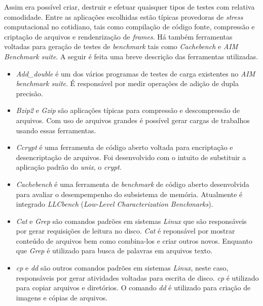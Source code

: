 Assim era possível criar, destruir e efetuar quaisquer tipos de testes com relativa comodidade. Entre as aplicações escolhidas estão típicas provedoras de \textit{stress} computacional no cotidiano, tais como compilação de código fonte, compressão e criptação de arquivos e rendenrização de \textit{frames}. Há também ferramentas voltadas para geração de testes de \textit{benchmark} tais como \textit{Cachebench} e \textit{AIM Benchmark suite}. A seguir é feita uma breve descrição das ferramentas utilizadas.

\begin{itemize}
\item \textit{Add\_double} \footnotemark[1]                                                                                                                               é um dos vários programas de testes de carga existentes no \textit{AIM benchmark suite}. É responsável por medir operações de adição de dupla precisão.

\item \textit{Bzip2} \footnotemark[2] e \textit{Gzip} \footnotemark[3] são aplicações típicas para compressão e descompressão de arquivos. Com uso de arquivos grandes é possível gerar cargas de trabalhos usando essas ferramentas.

\item \textit{Ccrypt} \footnotemark[4] é uma ferramenta de código aberto voltada para encriptação e desencriptação de arquivos. Foi desenvolvido com o intuito de substituir a aplicação padrão do \textit{unix}, o \textit{crypt}.

\item \textit{Cachebench} \footnotemark[5] é uma ferramenta de \textit{benchmark} de código aberto desenvolvida para avaliar o desempempenho do subsistema de memória. Atualmente é integrado \textit{LLCbench} (\textit{Low-Level Characterization Benchmarks}).

\item \textit{Cat} e \textit{Grep} são comandos padrões em sistemas \textit{Linux} que são responsáveis por gerar requisições de leitura no disco. \textit{Cat} é reponsável por mostrar conteúdo de arquivos bem como combina-los e criar outros novos. Enquanto que \textit{Grep} é utilizado para busca de palavras em arquivos texto.

\item \textit{cp} e \textit{dd} são outros comandos padrões em sistemas \textit{Linux}, neste caso, responsáveis por gerar atividades voltadas para escrita de disco. \textit{cp} é utilizado para copiar arquivos e diretórios. O comando \textit{dd} é utilizado para criação de imagens e cópias de arquivos.


\end{itemize}
